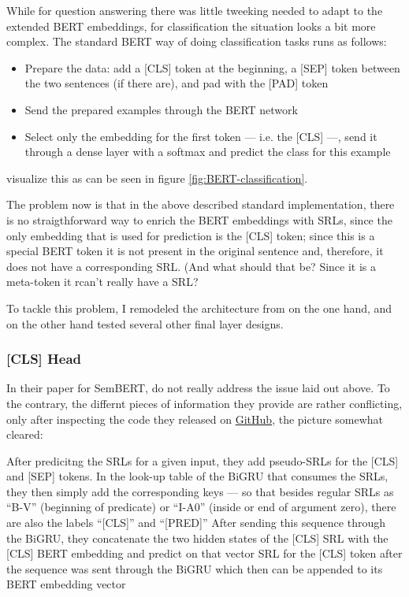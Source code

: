 While for question answering there was little tweeking needed to adapt to the extended BERT
embeddings, for classification the situation looks a bit more complex. The standard BERT way
of doing classification tasks runs as follows:

\begin{itemize}
  \item Prepare the data: add a [CLS] token at the beginning, a [SEP] token between the two sentences (if there are), and pad with the [PAD] token
  \item Send the prepared examples through the BERT network
  \item Select only the embedding for the first token  --- i.e. the [CLS] ---, send it through a dense layer with a softmax and predict the class for this example
\end{itemize}

\cite{devlin2018bert} visualize this as can be seen in figure \ref{fig:BERT-classification}.



The problem now is that in the above described standard implementation, there
is no straigthforward way to enrich the BERT embeddings with SRLs, since the
only embedding that is used for prediction is the [CLS] token; since this is a
special BERT token it is not present in the original sentence and, therefore,
it does not have a corresponding SRL. (And what should that be? Since it is a
meta-token it rcan't really have a SRL?

To tackle this problem, I remodeled the architecture from \cite{zhang2019semantics} on the one
hand, and on the other hand tested several other final layer designs.

\subsubsection{[CLS] Head}

In their paper for SemBERT, \cite{zhang2019semantics} do not really address the
issue laid out above. To the contrary, the differnt pieces of information they
provide are rather conflicting, only after inspecting the code they released on
\href{https://github.com/cooelf/SemBERT/}{GitHub}, the picture somewhat cleared:

After predicitng the SRLs for a given input, they add pseudo-SRLs for the [CLS] and [SEP] tokens.
In the look-up table of the BiGRU that consumes the SRLs, they then simply add the corresponding
keys --- so that besides regular SRLs as ``B-V'' (beginning of predicate) or ``I-A0'' (inside
or end of argument zero), there are also the labels ``[CLS]'' and ``[PRED]'' After sending this
sequence through the BiGRU, they concatenate the two hidden states of the [CLS] SRL with the
[CLS] BERT embedding and predict on that vector %
SRL for the [CLS] token after the sequence was sent through the BiGRU which then can be appended
to its BERT embedding vector

